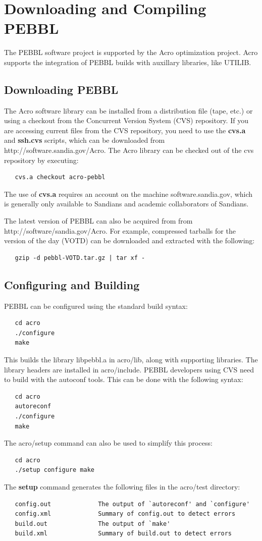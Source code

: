 \section{Downloading and Compiling PEBBL}


The PEBBL software project is supported by the Acro optimization
project.  Acro supports the integration of PEBBL builds with auxillary
libraries, like UTILIB.


\subsection{Downloading PEBBL}

The Acro software library can be installed from a distribution file
(tape, etc.) or using a checkout from the Concurrent Version System (CVS)
repository. If you are accessing current files from the CVS repository,
you need to use the {\bf cvs.a} and {\bf ssh.cvs} scripts, which can be
downloaded from http://software.sandia.gov/Acro.  The Acro library can
be checked out of the cvs repository by executing:
\begin{verbatim}
   cvs.a checkout acro-pebbl
\end{verbatim}
The use of {\bf cvs.a} requires an account on the machine software.sandia.gov,
which is generally only available to Sandians and academic collaborators
of Sandians.

The latest version of PEBBL can also be acquired from
from http://software/sandia.gov/Acro.  For example, compressed tarballs
for the version of the day (VOTD) can be downloaded and extracted with the 
following:
\begin{verbatim}
   gzip -d pebbl-VOTD.tar.gz | tar xf -
\end{verbatim}


\subsection{Configuring and Building}

PEBBL can be configured using the standard build syntax:
\begin{verbatim}
   cd acro
   ./configure
   make
\end{verbatim}
This builds the library libpebbl.a in acro/lib, along with supporting
libraries. The library headers are installed in acro/include.
PEBBL developers using CVS need to build with the autoconf tools.  This can be
done with the following syntax:
\begin{verbatim}
   cd acro
   autoreconf
   ./configure
   make
\end{verbatim}
The acro/setup command can also be used to simplify this process:
\begin{verbatim}
   cd acro
   ./setup configure make
\end{verbatim}
The {\bf setup} command generates the following files in the acro/test
directory:
\begin{verbatim}
   config.out             The output of `autoreconf' and `configure'
   config.xml             Summary of config.out to detect errors
   build.out              The output of `make'
   build.xml              Summary of build.out to detect errors
\end{verbatim}

